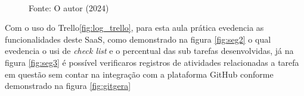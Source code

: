 \begin{figure}[H]
  \\

  \raggedright
  {\fontsize{10pt}{\baselineskip}\selectfont Fonte: O autor (2024)}
  \label{fig:resultado}
\end{figure}


\par Com o uso do Trello\ref{fig:log_trello}, para esta aula prática evedencia as funcionalidades deste SaaS, como demonstrado na figura \ref{fig:seg2} o qual evedencia o usi de \textit{check list} e o percentual das sub tarefas desenvolvidas, já na figura \ref{fig:seg3} é possível verificaros registros de atividades relacionadas a tarefa em questão sem contar na integração com a plataforma GitHub conforme demonstrado na figura \ref{fig:gitgera}

